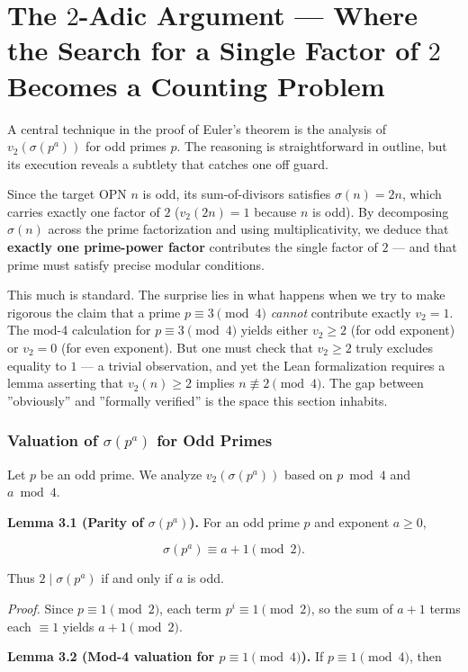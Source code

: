 \documentclass[11pt,a4paper]{article}
\begin{document}
\section{The $2$-Adic Argument --- Where the Search for a Single Factor of $2$ Becomes a Counting Problem}

A central technique in the proof of Euler's theorem is the analysis of $v_2(\sigma(p^a))$ for odd primes $p$. The reasoning is straightforward in outline, but its execution reveals a subtlety that catches one off guard.

Since the target OPN $n$ is odd, its sum-of-divisors satisfies $\sigma(n) = 2n$, which carries exactly one factor of $2$ ($v_2(2n) = 1$ because $n$ is odd). By decomposing $\sigma(n)$ across the prime factorization and using multiplicativity, we deduce that \textbf{exactly one prime-power factor} contributes the single factor of $2$ --- and that prime must satisfy precise modular conditions.

This much is standard. The surprise lies in what happens when we try to make rigorous the claim that a prime $p \equiv 3 \pmod{4}$ \emph{cannot} contribute exactly $v_2 = 1$. The mod-4 calculation for $p \equiv 3 \pmod{4}$ yields either $v_2 \ge 2$ (for odd exponent) or $v_2 = 0$ (for even exponent). But one must check that $v_2 \ge 2$ truly excludes equality to $1$ --- a trivial observation, and yet the Lean formalization requires a lemma asserting that $v_2(n) \ge 2$ implies $n \not\equiv 2 \pmod{4}$. The gap between ''obviously'' and ''formally verified'' is the space this section inhabits.

\subsubsection{Valuation of $\sigma(p^a)$ for Odd Primes}

Let $p$ be an odd prime. We analyze $v_2(\sigma(p^a))$ based on $p \bmod 4$ and $a \bmod 4$.

\textbf{Lemma 3.1 (Parity of $\sigma(p^a)$).} For an odd prime $p$ and exponent $a \ge 0$,

\[\sigma(p^a) \equiv a+1 \pmod{2}.\]

Thus $2 \mid \sigma(p^a)$ if and only if $a$ is odd.

\emph{Proof.} Since $p \equiv 1 \pmod{2}$, each term $p^i \equiv 1 \pmod{2}$, so the sum of $a+1$ terms each $\equiv 1$ yields $a+1 \pmod{2}$.

\textbf{Lemma 3.2 (Mod-4 valuation for $p \equiv 1 \pmod{4}$).} If $p \equiv 1 \pmod{4}$, then
\end{document}
